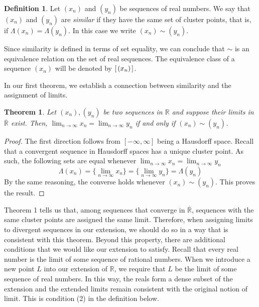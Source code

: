 \documentclass{amsart}
\theoremstyle{definition}
\newtheorem{definition}{Definition}
\theoremstyle{plain}
\newtheorem{theorem}{Theorem}
\begin{document}

\begin{definition}
Let $(x_n)$ and $(y_n)$ be sequences of real numbers. 
We say that $(x_n)$ and $(y_n)$ are \emph{similar} if they have the same
set of cluster points, that is, if $\Lambda(x_n) = \Lambda(y_n)$.
In this case we write $(x_n) \sim (y_n)$.
\end{definition}

Since similarity is defined in terms of set equality, we can conclude that $\sim$ is an 
equivalence relation on the set of real sequences. The equivalence class of a sequence $(x_n)$ will be denoted by $[\hspace{0.5mm} (x_n) \hspace{0.5mm} ]$. 



In our first theorem, we establish a connection between  similarity and the assignment of limits. 

\begin{theorem} Let $(x_n), (y_n)$ be two sequences in $\mathbb{R}$ and suppose their limits in $\overline{\mathbb{R}}$ exist.
Then, $\displaystyle \lim_{n \to \infty}x_n = \lim_{n \to \infty}y_n$ if and only if $(x_n) \sim (y_n)$. 

\end{theorem}
\begin{proof}
  The first direction follows from $[-\infty,\infty]$ being a Hausdorff space. Recall that a
convergent sequence in Hausdorff spaces has a unique cluster point. As such, 
the following sets are equal whenever  $\displaystyle \lim_{n \to \infty}x_n = \lim_{n \to \infty}y_n$
$$\Lambda(x_n) = \{\displaystyle \lim_{n \to \infty}x_n\} = \{\displaystyle \lim_{n \to \infty}y_n\} = \Lambda(y_n)$$
By the same reasoning, the converse holds whenever $(x_n) \sim (y_n)$. This proves the result. 


\end{proof}

Theorem 1 tells us that, among sequences that converge in $\overline{\mathbb{R}}$, sequences with the same cluster points are assigned the same limit. Therefore, when assigning limits to divergent sequences in our extension, we should do so in a way that is consistent with this theorem. Beyond this property, there are additional conditions that we would like our extension to satisfy.
Recall that every real number is the limit of some sequence of rational numbers. When we introduce a new point 
$L$ into our extension of $\mathbb R$, we require that 
$L$ be the limit of some sequence of real numbers. In this way, the reals form a dense subset of the extension and the extended limits remain consistent with the original notion of limit. This is condition (2) in the definition below.
\end{document}
